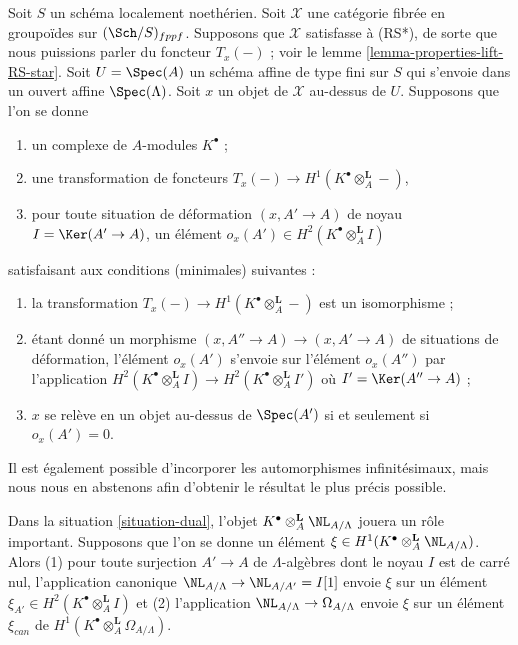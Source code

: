 \begin{situation}
\label{situation-dual}
Soit $S$ un schéma localement noethérien. Soit $\mathcal{X}$ une catégorie
fibrée en groupoïdes sur $(\Sch/S)_{fppf}$. Supposons que $\mathcal{X}$
satisfasse à (RS*), de sorte que nous puissions parler du foncteur $T_x(-)$ ;
voir le lemme \ref{lemma-properties-lift-RS-star}. Soit $U = \Spec(A)$ un
schéma affine de type fini sur $S$ qui s'envoie dans un ouvert affine
$\Spec(\Lambda)$. Soit $x$ un objet de $\mathcal{X}$ au-dessus de $U$.
Supposons que l'on se donne
\begin{enumerate}
\item un complexe de $A$-modules $K^\bullet$ ;
\item une transformation de foncteurs
$T_x(-) \to H^1(K^\bullet \otimes_A^\mathbf{L} -)$,
\item pour toute situation de déformation $(x, A' \to A)$ de noyau
$I = \Ker(A' \to A)$, un élément
$o_x(A') \in H^2(K^\bullet \otimes_A^\mathbf{L} I)$
\end{enumerate}
satisfaisant aux conditions (minimales) suivantes :
\begin{enumerate}
\item[(i)] la transformation
$T_x(-) \to H^1(K^\bullet \otimes_A^\mathbf{L} -)$
est un isomorphisme ;
\item[(ii)] étant donné un morphisme
$(x, A'' \to A) \to (x, A' \to A)$ de situations de déformation, l'élément
$o_x(A')$ s'envoie sur l'élément $o_x(A'')$ par l'application
$H^2(K^\bullet \otimes_A^\mathbf{L} I) \to
H^2(K^\bullet \otimes_A^\mathbf{L} I')$
où $I' = \Ker(A'' \to A)$ ;
\item[(iii)] $x$ se relève en un objet au-dessus de $\Spec(A')$ si et seulement si
$o_x(A') = 0$.
\end{enumerate}
Il est également possible d'incorporer les automorphismes infinitésimaux, mais
nous nous en abstenons afin d'obtenir le résultat le plus précis possible.
\end{situation}

\noindent
Dans la situation \ref{situation-dual}, l'objet
$K^\bullet \otimes_A^\mathbf{L} \NL_{A/\Lambda}$ jouera un rôle important.
Supposons que l'on se donne un élément
$\xi \in H^1(K^\bullet \otimes_A^\mathbf{L} \NL_{A/\Lambda})$. Alors (1) pour
toute surjection $A' \to A$ de $\Lambda$-algèbres dont le noyau $I$ est de
carré nul, l'application canonique
$\NL_{A/\Lambda} \to \NL_{A/A'} = I[1]$ envoie $\xi$ sur un élément
$\xi_{A'} \in H^2(K^\bullet \otimes_A^\mathbf{L} I)$ et (2) l'application
$\NL_{A/\Lambda} \to \Omega_{A/\Lambda}$ envoie $\xi$ sur un élément
$\xi_{can}$ de
$H^1(K^\bullet \otimes_A^\mathbf{L} \Omega_{A/\Lambda})$.

